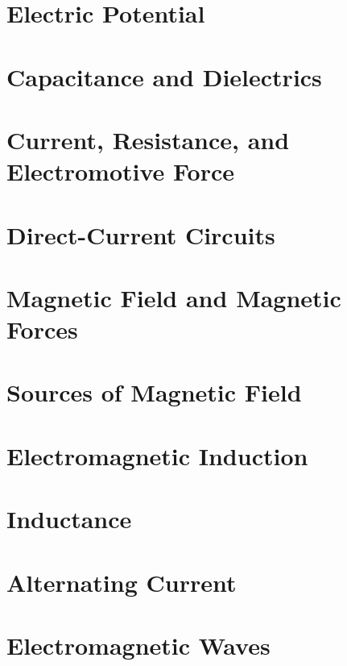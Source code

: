 \documentclass[11pt, letterpaper, titlepage]{report}
\title{\textbf{\Huge{ \begin{center}
Physics 230 Notes\\ %
\end{center} }}}
\author{ Lora Ma and Benjamin Kong\\}
\begin{document}
\maketitle

\maketitle %
{
  \hypersetup{}
  \parskip 0pt
  \tableofcontents
} %
\newpage
{}
\pagestyle{mypagestyle}



%

\chapter{Electric Potential}
\chapter{Capacitance and Dielectrics}
\chapter{Current, Resistance, and Electromotive Force}
\chapter{Direct-Current Circuits}
\chapter{Magnetic Field and Magnetic Forces}
\chapter{Sources of Magnetic Field}
\chapter{Electromagnetic Induction}
\chapter{Inductance}
\chapter{Alternating Current}
\chapter{Electromagnetic Waves}
\end{document}
